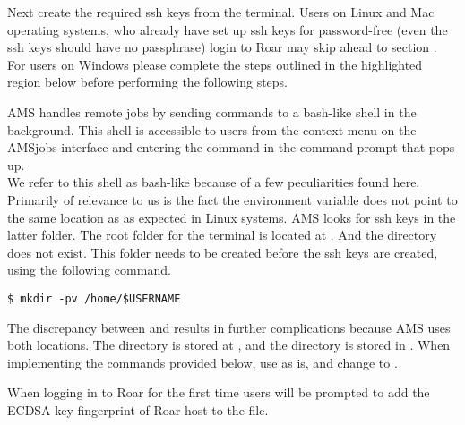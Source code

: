 Next create the required ssh keys from the terminal. 
Users on Linux and Mac operating systems, who already have set up ssh keys for password-free (even the ssh keys should have no passphrase) login to Roar may skip ahead to section . 
For users on Windows please complete the steps outlined in the highlighted region below before performing the following steps.\\
\vspace{1ex}
\begin{tcolorbox}[colback=pantone!10!white,colframe=pantone,title=\textit{For Windows local machines only, perform this step first.}]
    AMS handles remote jobs by sending commands to a bash-like shell in the background. 
    This shell is accessible to users from the context menu  on the AMSjobs interface and entering the command  in the command prompt that pops up. \\

    We refer to this shell as bash-like because of a few peculiarities found here. 
    Primarily of relevance to us is the fact the  environment variable does not point to the same location as  as expected in Linux systems. 
    AMS looks for ssh keys in the latter folder. 
    The root folder for the terminal is located at . 
    And the directory  does not exist. 
    This folder needs to be created before the ssh keys are created, using the following command.
    \begin{lstlisting}[backgroundcolor=\color{inboxgray},
        frame=single,
        gobble=8
        ]
        $ mkdir -pv /home/$USERNAME
    \end{lstlisting}
    The discrepancy between  and  results in further complications because AMS uses both locations. 
    The  directory is stored at , and the  directory is stored in .
    When implementing the commands provided below, use  as is, and change  to .
\end{tcolorbox}
When logging in to Roar for the first time users will be prompted to add the ECDSA key fingerprint of Roar host to the  file. 

